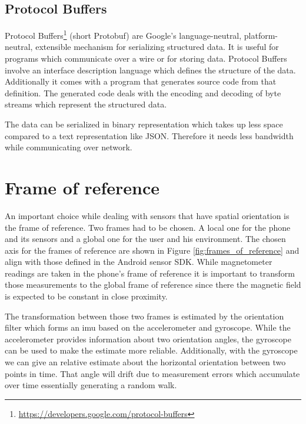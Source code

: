 \subsection{Protocol Buffers}
\label{sec:protobuf}

Protocol Buffers\footnote{\url{https://developers.google.com/protocol-buffers}} (short Protobuf) are Google's language-neutral, platform-neutral, extensible mechanism for serializing structured data. It is useful for programs which communicate over a wire or for storing data. Protocol Buffers involve an interface description language which defines the structure of the data. Additionally it comes with a program that generates source code from that definition. The generated code deals with the encoding and decoding of byte streams which represent the structured data.

The data can be serialized in binary representation which takes up less space compared to a text representation like JSON. Therefore it needs less bandwidth while communicating over network.

\section{Frame of reference}

An important choice while dealing with sensors that have spatial orientation is the frame of reference. Two frames had to be chosen. A local one for the phone and its sensors and a global one for the user and his environment. The chosen axis for the frames of reference are shown in Figure \ref{fig:frames_of_reference} and align with those defined in the Android sensor SDK. While magnetometer readings are taken in the phone's frame of reference it is important to transform those measurements to the global frame of reference since there the magnetic field is expected to be constant in close proximity.\cite{android_sdk_sensorevent}

The transformation between those two frames is estimated by the orientation filter which forms an \gls{imu} based on the accelerometer and gyroscope. While the accelerometer provides information about two orientation angles, the gyroscope can be used to make the estimate more reliable. Additionally, with the gyroscope we can give an relative estimate about the horizontal orientation between two points in time. That angle will drift due to measurement errors which accumulate over time essentially generating a random walk.

